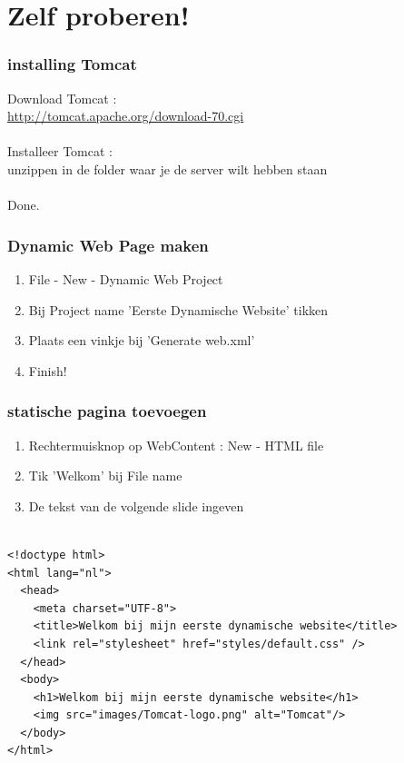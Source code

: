 \documentclass{beamer}
\begin{document}
\section{Zelf proberen!}


\begin{frame}

\frametitle{installing Tomcat}

{\LARGE Download Tomcat : \\{\Large \url{http://tomcat.apache.org/download-70.cgi}}\\~\\

Installeer Tomcat : \\unzippen in de folder waar je de server wilt hebben staan\\~\\

Done.}

\end{frame}


\begin{frame} 

\frametitle{Dynamic Web Page maken}

{\Large \begin{enumerate}
  \item File - New - Dynamic Web Project
  \item Bij Project name 'Eerste Dynamische Website' tikken
  \item Plaats een vinkje bij 'Generate web.xml'
  \item Finish!
\end{enumerate}}

\end{frame}


\begin{frame}

\frametitle{statische pagina toevoegen}

{\Large \begin{enumerate}
  \item Rechtermuisknop op WebContent : New - HTML file
  \item Tik 'Welkom' bij File name
  \item De tekst van de volgende slide ingeven
\end{enumerate}}

\end{frame}


\begin{frame}[fragile]

\begin{verbatim}

<!doctype html>
<html lang="nl">
  <head>
    <meta charset="UTF-8">
    <title>Welkom bij mijn eerste dynamische website</title>
    <link rel="stylesheet" href="styles/default.css" />
  </head>
  <body>
    <h1>Welkom bij mijn eerste dynamische website</h1>
    <img src="images/Tomcat-logo.png" alt="Tomcat"/>
  </body>
</html>


\end{verbatim}

\end{frame}
\end{document}
